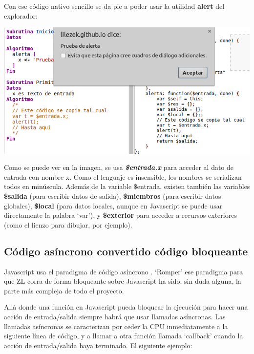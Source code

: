 \documentclass{report}
\begin{document}
	Con ese código nativo sencillo se da pie a poder usar la utilidad \textbf{alert} del explorador:
	
	\begin{center}
	\includegraphics[width=1\linewidth]{alert}
	\end{center}
	
	\vspace{10px}
	
	Como se puede ver en la imagen, se usa \textbf{\textit{\$entrada.x}} para acceder al dato de entrada con nombre x. Como el lenguaje es insensible, los nombres se serializan todos en minúscula. Además de la variable \$entrada, existen también las variables \textbf{\$salida} (para escribir datos de salida), \textbf{\$miembros} (para escribir datos globales), \textbf{\$local} (para datos locales, aunque en Javascript se puede usar directamente la palabra `var'), y \textbf{\$exterior} para acceder a recursos exteriores (como el lienzo para dibujar, por ejemplo). 
	
	\subsection{Código asíncrono convertido código bloqueante}
	
	Javascript usa el paradigma de código asíncrono \cite{javascriptasync}. `Romper' ese paradigma para que ZL corra de forma bloqueante sobre Javascript ha sido, sin duda alguna, la parte más compleja de todo el proyecto. 
	
	\vspace{10px}

	Allá donde una función en Javascript pueda bloquear la ejecución para hacer una acción de entrada/salida siempre habrá que usar llamadas asíncronas. Las llamadas asíncronas se caracterizan por ceder la CPU inmediatamente a la siguiente línea de código, y a llamar a otra función llamada `callback' cuando la acción de entrada/salida haya terminado. El siguiente ejemplo:
	
\end{document}
